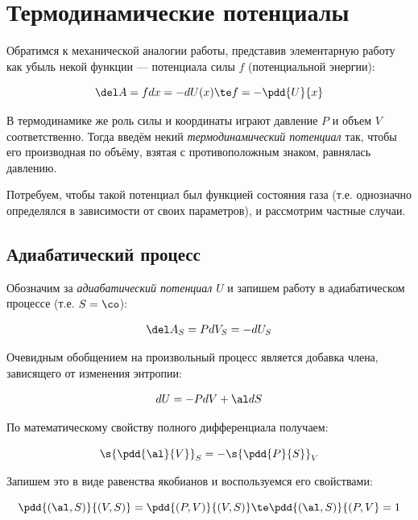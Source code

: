 \documentclass[12pt]{kiarticle}
\begin{document}
\section{Термодинамические потенциалы}

Обратимся к механической аналогии работы, представив элементарную работу как убыль некой функции --- потенциала силы $ f $ (потенциальной энергии):

\begin{equation}\label{}
\del A = fdx = -dU(x) \te f = -\pdd{U}{x}
\end{equation}

В термодинамике же роль силы и координаты играют давление $ P $ и объем $ V $ соответственно. Тогда введём некий \textit{термодинамический потенциал} так, чтобы его производная по объёму, взятая с противоположным знаком, равнялась давлению. 

Потребуем, чтобы такой потенциал был функцией состояния газа (т.е. однозначно определялся в зависимости от своих параметров), и рассмотрим частные случаи.

\subsection{Адиабатический процесс}

Обозначим за \textit{адиабатический потенциал} $ U $ и запишем работу в адиабатическом процессе (т.е. $ S = \co $):

\begin{equation}\label{U_S}
\del A_S = P dV_S = - dU_S
\end{equation}

Очевидным обобщением на произвольный процесс является добавка члена, зависящего от изменения энтропии:

\begin{equation}\label{U}
dU = - PdV + \al dS
\end{equation}

По математическому свойству полного дифференциала получаем:

\begin{equation}\label{}
\s{\pdd{\al}{V}}_S = - \s{\pdd{P}{S}}_V
\end{equation}

Запишем это в виде равенства якобианов и воспользуемся его свойствами:

\begin{equation}\label{}
\pdd{(\al, S)}{(V, S)} = \pdd{(P, V)}{(V, S)} \te \pdd{(\al, S)}{(P, V} = 1
\end{equation}
\end{document}
